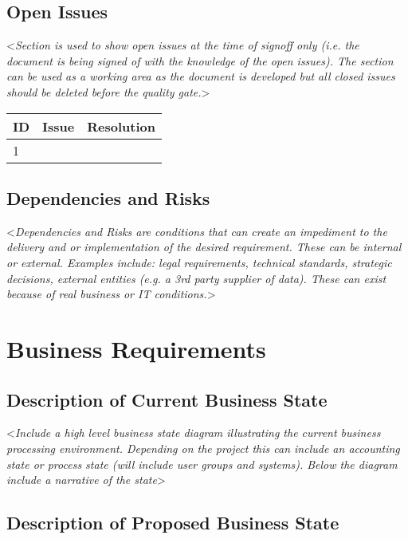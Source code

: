 \documentclass[english,12pt]{scrartcl}
\newcommand{\comment}[1]{\textless\textit{#1}\textgreater\vspace*{1ex}}
\begin{document}
\subsection{Open Issues}
 
\comment{Section is used to show open issues at the time of signoff only (i.e. the document is being signed of with the knowledge of the open issues). The section can be used as a working area as the document is developed but all closed issues should be deleted before the quality gate.}
 
\begin{tabular}{p{}p{}p{}} \toprule
ID & Issue	& Resolution \\ \midrule
1 & & 	\\ \bottomrule
\end{tabular}
 
 
\subsection{Dependencies and Risks}
 
\comment{Dependencies and Risks are conditions that can create an impediment to the delivery and or implementation of the desired requirement.  These can be internal or external.  Examples include: legal requirements, technical standards, strategic decisions, external entities (e.g. a 3rd party supplier of data).  These can exist because of real business or IT conditions.}
 
\section{Business Requirements}
 
\subsection{Description of Current Business State}
 
\comment{Include a high level business state diagram illustrating the current business processing environment.  Depending on the project this can include an accounting state or process state (will include user groups and systems).  Below the diagram include a narrative of the state}
 
 
\subsection{Description of Proposed Business State}
 
\end{document}
